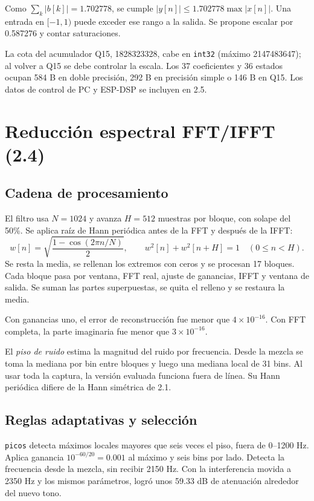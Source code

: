 \documentclass[11pt,a4paper]{article}
\newcommand{\ruta}[1]{\nolinkurl{#1}}
\begin{document}
Como $\sum_k|b[k]|=1.702778$, se cumple $|y[n]|\leq1.702778\max|x[n]|$. Una entrada en $[-1,1)$ puede exceder ese rango a la salida. Se propone escalar por 0.587276 y contar saturaciones.

La cota del acumulador Q15, 1828323328, cabe en \ruta{int32} (máximo 2147483647); al volver a Q15 se debe controlar la escala. Los 37 coeficientes y 36 estados ocupan 584 B en doble precisión, 292 B en precisión simple o 146 B en Q15. Los datos de control de PC y ESP-DSP se incluyen en 2.5.

\section{Reducción espectral FFT/IFFT (2.4)}
\subsection{Cadena de procesamiento}
El filtro usa $N=1024$ y avanza $H=512$ muestras por bloque, con solape del 50\%. Se aplica raíz de Hann periódica antes de la FFT y después de la IFFT:
\begin{equation}
w[n]=\sqrt{\frac{1-\cos(2\pi n/N)}2},\qquad
w^2[n]+w^2[n+H]=1\quad (0\leq n<H).
\end{equation}
Se resta la media, se rellenan los extremos con ceros y se procesan 17 bloques. Cada bloque pasa por ventana, FFT real, ajuste de ganancias, IFFT y ventana de salida. Se suman las partes superpuestas, se quita el relleno y se restaura la media.

Con ganancias uno, el error de reconstrucción fue menor que $4\times10^{-16}$. Con FFT completa, la parte imaginaria fue menor que $3\times10^{-16}$.

El \emph{piso de ruido} estima la magnitud del ruido por frecuencia. Desde la mezcla se toma la mediana por bin entre bloques y luego una mediana local de 31 bins. Al usar toda la captura, la versión evaluada funciona fuera de línea. Su Hann periódica difiere de la Hann simétrica de 2.1.

\subsection{Reglas adaptativas y selección}
\ruta{picos} detecta máximos locales mayores que seis veces el piso, fuera de 0--1200 Hz. Aplica ganancia $10^{-60/20}=0.001$ al máximo y seis bins por lado. Detecta la frecuencia desde la mezcla, sin recibir 2150 Hz. Con la interferencia movida a 2350 Hz y los mismos parámetros, logró unos 59.33 dB de atenuación alrededor del nuevo tono.
\end{document}
